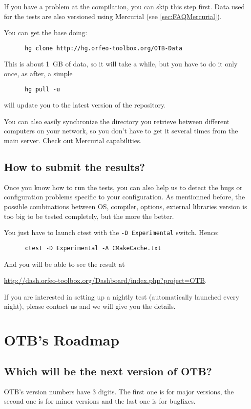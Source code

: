 If you have a problem at the compilation, you can skip this step first.
Data used for the tests are also versioned using Mercurial (see \ref{sec:FAQMercurial}).

You can get the base doing:
\begin{verbatim}
      hg clone http://hg.orfeo-toolbox.org/OTB-Data
\end{verbatim}

This is about 1~GB of data, so it will take a while, but you have to do it only once, as after, a simple
\begin{verbatim}
      hg pull -u
\end{verbatim}
will update you to the latest version of the repository.

You can also easily synchronize the directory you retrieve between different computers on your network, so you don't have to get it several times from the main server. Check out Mercurial capabilities.

\subsection{How to submit the results?}

Once you know how to run the tests, you can also help us to detect the bugs or configuration problems specific to your configuration. As mentionned before, the possible combinations between OS, compiler, options, external libraries version is too big to be tested completely, but the more the better.

You just have to launch ctest with the \texttt{-D Experimental} switch. Hence:
\begin{verbatim}
      ctest -D Experimental -A CMakeCache.txt
\end{verbatim}

And you will be able to see the result at

\url{http://dash.orfeo-toolbox.org/Dashboard/index.php?project=OTB}.

If you are interested in setting up a nightly test (automatically launched every night), please contact us and we will give you the details.

\section{OTB's Roadmap}

\subsection{Which will be the next version of OTB?}
OTB's version numbers have 3 digits. The first one is for major
versions, the second one is for minor versions and the last one is for
bugfixes.


